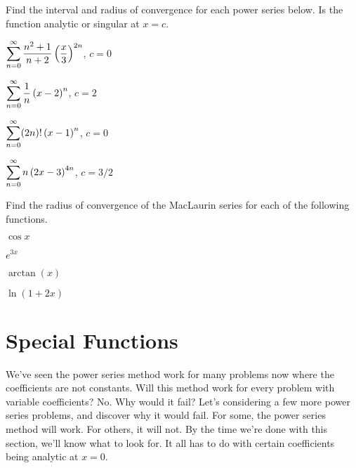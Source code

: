 \begin{problem}
%
 Find the interval and radius of convergence for each power series below. Is the function analytic or singular at $x=c$. 
\begin{enumerate}
\begin{multicols}{2}
 \item $\displaystyle\sum_{n=0}^\infty \frac{n^2+1}{n+2}\left(\frac{x}{3}\right)^{2n}$, $c=0$
 \item $\displaystyle\sum_{n=0}^\infty \frac{1}{n}\left(x-2\right)^{n}$, $c=2$
 \item $\displaystyle\sum_{n=0}^\infty (2n)!\left(x-1\right)^{n}$, $c=0$
 \item $\displaystyle\sum_{n=0}^\infty n\left(2x-3\right)^{4n}$, $c=3/2$
 \end{multicols}
\end{enumerate}
\end{problem}

\begin{problem}
 Find the radius of convergence of the MacLaurin series for each of the following functions.
\begin{enumerate}
\begin{multicols}{4}
\item $\cos x$
\item $e^{3x}$
\item $\arctan(x)$ 
\item $\ln(1+2x)$
\end{multicols}
\end{enumerate}

\end{problem}


 
\section{Special Functions}

We've seen the power series method work for many problems now where the coefficients are not constants.  Will this method work for every problem with variable coefficients? No. Why would it fail?  Let's considering a few more power series problems, and discover why it would fail. For some, the power series method will work.  For others, it will not.  By the time we're done with this section, we'll know what to look for.  It all has to do with certain coefficients being analytic at $x=0$. 

